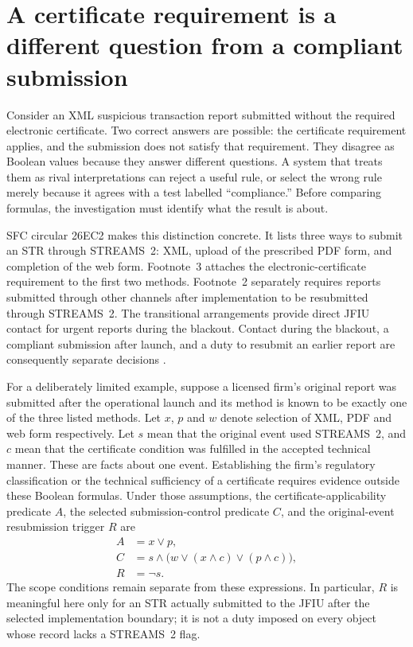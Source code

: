 \section{A certificate requirement is a different question from a compliant submission}
\label{sec:typed-decision-assurance}

Consider an XML suspicious transaction report submitted without the required
electronic certificate. Two correct answers are possible: the certificate
requirement applies, and the submission does not satisfy that requirement.
They disagree as Boolean values because they answer different questions. A
system that treats them as rival interpretations can reject a useful rule,
or select the wrong rule merely because it agrees with a test labelled
``compliance.'' Before comparing formulas, the investigation must identify what
the result is about.

SFC circular 26EC2 makes this distinction concrete. It lists three ways to
submit an STR through STREAMS~2: XML, upload of the prescribed PDF form, and
completion of the web form. Footnote~3 attaches the electronic-certificate
requirement to the first two methods. Footnote~2 separately requires reports
submitted through other channels after implementation to be resubmitted through
STREAMS~2. The transitional arrangements provide direct JFIU contact for urgent
reports during the blackout. Contact during the blackout, a compliant submission
after launch, and a duty to resubmit an earlier report are consequently separate
decisions \citep{sfcstr2026}.

For a deliberately limited example, suppose a licensed firm's original report
was submitted after the operational launch and its method is known to be exactly
one of the three listed methods. Let $x$, $p$ and $w$ denote selection of XML,
PDF and web form respectively. Let $s$ mean that the original event used
STREAMS~2, and $c$ mean that the certificate condition was fulfilled in the
accepted technical manner. These are facts about one event. Establishing the
firm's regulatory classification or the technical sufficiency of a certificate
requires evidence outside these Boolean formulas. Under those assumptions, the
certificate-applicability predicate $A$, the selected submission-control
predicate $C$, and the original-event resubmission trigger $R$ are
\begin{align}
 A &= x \lor p,\label{eq:str-certificate-applicability}\\
 C &= s \land \bigl(w \lor (x\land c) \lor (p\land c)\bigr),\label{eq:str-selected-submission}\\
 R &= \neg s.\label{eq:str-resubmission-trigger}
\end{align}
The scope conditions remain separate from these expressions. In particular,
$R$ is meaningful here only for an STR actually submitted to the JFIU after the
selected implementation boundary; it is not a duty imposed on every object
whose record lacks a STREAMS~2 flag.

